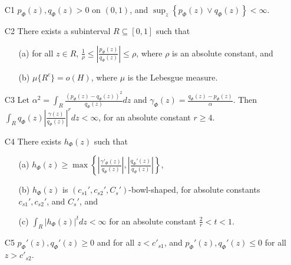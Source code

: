 \documentclass{article}
\begin{document}
\begin{proposition}
\begin{enumerate}
\item[C1] $p_{\Phi}(z), q_{\Phi}(z) > 0$ on $(0, 1)$, and $\sup_z \left\{p_{\Phi}(z) \vee q_{\Phi}(z)\right\} < \infty$. 
\item[C2] There exists a subinterval $R \subseteq [0,1]$ such that
\begin{itemize}
\item[(a)] for all $z \in R$, $\frac{1}{\rho} \leq \left| \frac{p_{\Phi}(z)}{q_{\Phi}(z)} \right| \leq \rho$, where $\rho$ is an absolute constant, and
\item[(b)] $\mu\{R^c\} = o(H)$, where $\mu$ is the Lebesgue measure.
\end{itemize}
\item[C3] Let $\alpha^2 = \int_R \frac{(p_{\Phi}(z) - q_{\Phi}(z))^2}{q_{\Phi}(z)} dz$ and $\gamma_{\Phi} (z) = \frac{q_{\Phi}(z) - p_{\Phi}(z)}{\alpha}$. Then $\int_R q_{\Phi}(z) \left| \frac{\gamma(z)}{q_{\Phi}(z)} \right|^r dz  < \infty$, for an absolute constant $r \geq 4$.
\item[C4] There exists $h_{\Phi}(z)$ such that
\begin{itemize}
\item[(a)] $h_{\Phi}(z) \geq \max \left\{  \left|\frac{\gamma'_{\Phi}(z)}{q_{\Phi}(z)} \right|, 
 \left|\frac{q_{\Phi}'(z)}{q_{\Phi}(z)}\right|  \right\} $,
 \item[(b)] $h_{\Phi}(z)$ is $(c_{s1}', c_{s2}', C_s')$-bowl-shaped, for absolute constants $c_{s1}', c_{s2}'$, and $C_s'$, and
\item[(c)] $\int_R |h_{\Phi}(z)|^t dz < \infty$ for an absolute constant $\frac{2}{r} < t < 1$.
\end{itemize}
\item[C5] $p_{\Phi}'(z), q_{\Phi}'(z) \geq 0$ and for all $z < c'_{s1}$, and $p_{\Phi}'(z), q_{\Phi}'(z) \leq 0$ for all $z > c'_{s2}$.
\end{enumerate}
\end{proposition}
\end{document}
